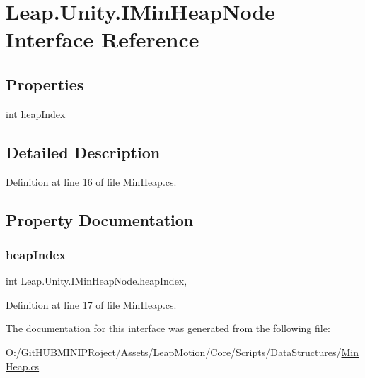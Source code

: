 \hypertarget{interface_leap_1_1_unity_1_1_i_min_heap_node}{}\section{Leap.\+Unity.\+I\+Min\+Heap\+Node Interface Reference}
\label{interface_leap_1_1_unity_1_1_i_min_heap_node}
\subsection*{Properties}
\begin{DoxyCompactItemize}
\item 
int \mbox{\hyperlink{interface_leap_1_1_unity_1_1_i_min_heap_node_a49743555188d987616c9602bfbcfe97a}{heap\+Index}}
\end{DoxyCompactItemize}


\subsection{Detailed Description}


Definition at line 16 of file Min\+Heap.\+cs.



\subsection{Property Documentation}
\mbox{\label{interface_leap_1_1_unity_1_1_i_min_heap_node_a49743555188d987616c9602bfbcfe97a}} 
\subsubsection{\texorpdfstring{heapIndex}{heapIndex}}
{\footnotesize\ttfamily int Leap.\+Unity.\+I\+Min\+Heap\+Node.\+heap\+Index\hspace{0.3cm}{\ttfamily [get]}, {\ttfamily [set]}}



Definition at line 17 of file Min\+Heap.\+cs.



The documentation for this interface was generated from the following file\+:\begin{DoxyCompactItemize}
\item 
O\+:/\+Git\+H\+U\+B\+M\+I\+N\+I\+P\+Roject/\+Assets/\+Leap\+Motion/\+Core/\+Scripts/\+Data\+Structures/\mbox{\hyperlink{_min_heap_8cs}{Min\+Heap.\+cs}}\end{DoxyCompactItemize}
